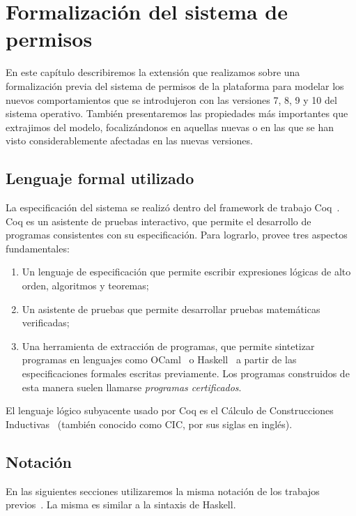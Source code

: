 \chapter{Formalización del sistema de permisos}
\label{chapter:formalization}

En este capítulo describiremos la extensión que realizamos sobre una formalización
previa\cite{luna-cleiej} del sistema de permisos de la plataforma para modelar los nuevos
comportamientos que se introdujeron con las versiones 7, 8, 9 y 10 del sistema operativo. También
presentaremos las propiedades más importantes que extrajimos del modelo, focalizándonos en aquellas
nuevas o en las que se han visto considerablemente afectadas en las nuevas versiones.


\section{Lenguaje formal utilizado}
\label{section:formalization:formal-language}
La especificación del sistema se realizó dentro del framework de trabajo Coq~\cite{coq}. Coq es un
asistente de pruebas interactivo, que permite el desarrollo de programas consistentes con su especificación.
Para lograrlo, provee tres aspectos fundamentales:
\begin{enumerate}
    \item Un lenguaje de especificación que permite escribir expresiones lógicas de alto orden, algoritmos y teoremas;
    \item Un asistente de pruebas que permite desarrollar pruebas matemáticas verificadas;
    \item Una herramienta de extracción de programas, que permite sintetizar programas en lenguajes
          como OCaml~\cite{ocaml} o Haskell~\cite{haskell} a partir de las especificaciones formales escritas
          previamente. Los programas construidos de esta manera suelen llamarse \textit{programas
              certificados}.
\end{enumerate}

El lenguaje lógico subyacente usado por Coq es el Cálculo de Construcciones Inductivas~\cite{cic}
(también conocido como CIC, por sus siglas en inglés).

\section{Notación}
En las siguientes secciones  utilizaremos la misma notación de los trabajos
previos~\cite{luna-cleiej,betarte-2017,betarte-2016}. La misma es similar a la sintaxis de Haskell.

